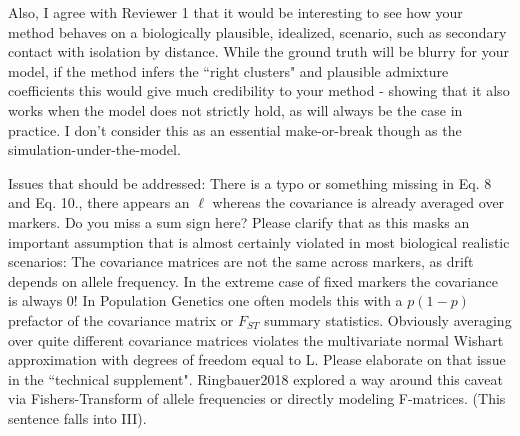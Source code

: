 \begin{point}{}
    Also, I agree with Reviewer 1 that it would be interesting to see how your method behaves on a biologically plausible, 
idealized, scenario, such as secondary contact with isolation by distance. 
While the ground truth will be blurry for your model, 
if the method infers the ``right clusters" and plausible admixture coefficients 
this would give much credibility to your method - 
showing that it also works when the model does not strictly hold, 
as will always be the case in practice. 
I don't consider this as an essential make-or-break though as the simulation-under-the-model.
\end{point}


\begin{point}{}
    Issues that should be addressed:
 There is a typo or something missing in Eq. 8 and Eq. 10., 
 there appears an $\ell$ whereas the covariance is already averaged over markers. 
 Do you miss a sum sign here? 
 Please clarify that as this masks an important assumption 
 that is almost certainly violated in most biological realistic scenarios:
The covariance matrices are not the same across markers, 
as drift depends on allele frequency. 
In the extreme case of fixed markers the covariance is always 0! 
In Population Genetics one often models this with a $p(1-p)$ 
prefactor of the covariance matrix or $F_{ST}$ summary statistics. 
Obviously averaging over quite different covariance matrices 
violates the multivariate normal Wishart approximation with 
degrees of freedom equal to L. 
Please elaborate on that issue in the ``technical supplement".
Ringbauer2018 explored a way around this caveat via Fishers-Transform of allele
frequencies or directly modeling F-matrices. (This sentence falls into III).
\end{point}


